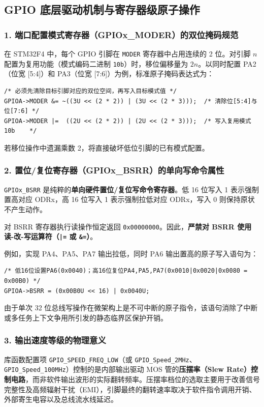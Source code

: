\documentclass[11pt,a4paper]{ctexart}
\begin{document}
\subsection{GPIO 底层驱动机制与寄存器级原子操作}

\subsubsection*{1. 端口配置模式寄存器（GPIOx\_MODER）的双位掩码规范}
在 STM32F4 中，每个 GPIO 引脚在 \texttt{MODER} 寄存器中占用连续的 2 位。对引脚 $n$ 配置为复用功能（模式编码二进制 \texttt{10b}）时，移位偏移量为 $2n$。以同时配置 PA2（位宽 [5:4]）和 PA3（位宽 [7:6]）为例，标准原子掩码表达式为：
\begin{lstlisting}[style=cstyle]
/* 必须先清除目标引脚对应的双位空间，再写入目标模式值 */
GPIOA->MODER &= ~((3U << (2 * 2)) | (3U << (2 * 3)));  /* 清除位[5:4]与位[7:6] */
GPIOA->MODER |=  ((2U << (2 * 2)) | (2U << (2 * 3)));  /* 写入复用模式 10b    */
\end{lstlisting}
若移位操作中遗漏乘数 2，将直接破坏低位引脚的已有模式配置。

\subsubsection*{2. 置位/复位寄存器（GPIOx\_BSRR）的单向写命令属性}
\texttt{GPIOx\_BSRR} 是纯粹的\textbf{单向硬件置位/复位写命令寄存器}。低 16 位写入 1 表示强制置高对应 ODRx，高 16 位写入 1 表示强制拉低对应 ODRx，写入 0 则保持原状不产生动作。

对 BSRR 寄存器执行读操作恒定返回 \texttt{0x00000000}。因此，\textbf{严禁对 BSRR 使用读-改-写运算符（\texttt{|=} 或 \texttt{\&=}）}。

例如，实现 PA4、PA5、PA7 输出拉低，同时 PA6 输出置高的原子写入语句为：
\begin{lstlisting}[style=cstyle]
/* 低16位设置PA6(0x0040)；高16位复位PA4,PA5,PA7(0x0010|0x0020|0x0080 = 0x00B0) */
GPIOA->BSRR = (0x00B0U << 16) | 0x0040U;
\end{lstlisting}
由于单次 32 位总线写操作在微架构上是不可中断的原子指令，该语句消除了中断或多任务上下文争用所引发的静态临界区保护开销。

\subsubsection*{3. 输出速度等级的物理意义}
库函数配置项 \texttt{GPIO\_SPEED\_FREQ\_LOW}（或 \texttt{GPIO\_Speed\_2MHz}、\texttt{GPIO\_Speed\_100MHz}）控制的是内部输出驱动 MOS 管的\textbf{压摆率（Slew Rate）控制电路}，而非软件输出波形的实际翻转频率。压摆率档位的选取主要用于改善信号完整性及高频辐射干扰（EMI），引脚最终的翻转速率取决于软件指令调用开销、外部寄生电容以及总线流水线延迟。
\end{document}
